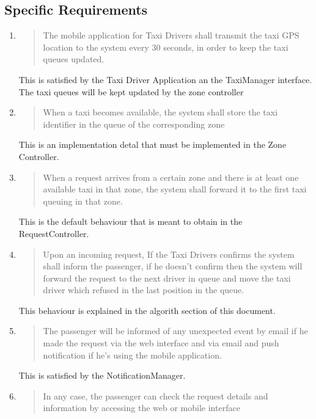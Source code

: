 \documentclass[11pt, a4paper,titlepage]{article}
\begin{document}
	\subsection{Specific Requirements}
			\begin{enumerate}
				\item
				\begin{quotation}
					 The mobile application for Taxi Drivers shall transmit the taxi GPS location to the system every 30 seconds, in order to keep the taxi queues updated.
				\end{quotation}
				This is satisfied by the Taxi Driver Application an the TaxiManager interface. The taxi queues will be kept updated by the zone controller
				\item
				\begin{quotation}
					 When a taxi becomes available, the system shall store the taxi identifier in the queue of the corresponding zone
				\end{quotation}
				This is an implementation detal that must be implemented in the Zone Controller.
				\item
				\begin{quotation} 
					When a request arrives from a certain zone and there is at least one available taxi in that zone, the system shall forward it to the first taxi queuing in that zone.
				\end{quotation}
				This is the default behaviour that is meant to obtain in the RequestController.
				\item
				\begin{quotation}
			 Upon an incoming request, If the Taxi Drivers confirms  the system shall inform the passenger, if he doesn’t confirm then the system will forward the request to the next driver in queue and move the taxi driver which refused in the last position in the queue.
			\end{quotation}
			This behaviour is explained in the algorith section of this document.
			\item
			\begin{quotation} 
				 The passenger will be informed of any unexpected event by email if he made the request via the web interface and via email and push notification if he’s using the mobile application. 
			\end{quotation}
			This is satisfied by the NotificationManager.
			\item
			\begin{quotation} 
				 In any case, the passenger can check the request details and information by accessing the web or mobile interface

\end{quotation}
\end{enumerate}
\end{document}
